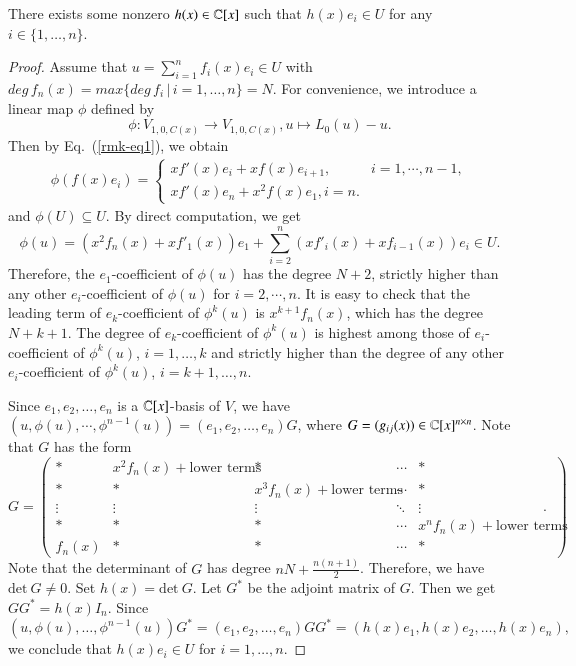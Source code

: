 \documentclass[12pt]{amsart}
\begin{document}
\begin{lem}\label{lem-l2}
There exists some nonzero $h(x)\in \mathbb{C}[x]$ such that $h(x)e_i\in U$ for any $i\in \{1, \ldots,n\}$.
\end{lem}
\begin{proof}
Assume that $u=\sum_{i=1}^n f_i(x)e_i\in U$ with $deg\,f_n(x)=max\{deg\,f_i\,|\, i=1,\ldots,n\}=N$. For convenience, we introduce a linear map $\phi$ defined by $$\phi:V_{1,0,C(x)}\rightarrow V_{1, 0, C(x)}, u\mapsto L_0(u)-u.$$ Then by Eq.~(\ref{rmk-eq1}), we obtain\begin{equation*}
\begin{aligned}
\phi(f(x) e_i)=
\begin{cases}
x f'(x)e_i + x f(x) e_{i+1}, &i=1,\cdots,n-1, \\
x f'(x)e_n + x^2 f(x) e_1,i=n.
\end{cases}
\end{aligned}
\end{equation*} and $\phi(U)\subseteq U$. By direct computation, we get
$$\phi(u)=(x^2f_n(x)+xf'_1(x))e_1+\sum_{i=2}^n (x f'_i(x)+xf_{i-1}(x)) e_i\in U.$$
Therefore, the $e_1$-coefficient of $\phi(u)$ has the
degree $N+2$, strictly higher than any other $e_i$-coefficient of $\phi(u)$ for $i=2,\cdots,n$.
It is easy to check that the leading term of $e_k$-coefficient of $\phi^k(u)$ is $x^{k+1}f_n(x)$, which has
the degree $N+k+1$.
The degree of $e_k$-coefficient of $\phi^k(u)$ is highest among those of $e_i$-coefficient of $\phi^k(u)$, $i=1,\ldots,k$ and
strictly higher than the degree of any other $e_i$-coefficient of $\phi^k(u)$, $i=k+1,\ldots,n$. %

Since $e_1,e_2,\ldots,e_n$ is a $\mathbb{C}[x]$-basis of $V$, we have
$(u,\phi(u),\cdots,\phi^{n-1}(u))=(e_1,e_2,\ldots,e_n)G$, where $G=(g_{ij}(x))\in\mathbb{C}[x]^{n\times n}$.
Note that
$G$ has the form
\begin{equation}
G=
\begin{pmatrix}
\ast &x^2f_n(x)+\text{lower terms}&\ast&\cdots&\ast\\
\ast &\ast&x^3f_n(x)+\text{lower terms}&\cdots&\ast\\
\vdots&\vdots&\vdots&\ddots&\vdots\\
\ast&\ast&\ast&\cdots&x^nf_n(x)+\text{lower terms}\\
f_n(x)&\ast&\ast&\cdots&\ast
\end{pmatrix}.
\end{equation}
Note that the determinant of $G$ has degree $nN+\frac{n(n+1)}{2}$. Therefore, we have $\text{det}~G\neq 0$. Set $h(x)=\text{det}~G$.
Let $G^*$ be the adjoint matrix of $G$. Then we get $GG^*=h(x)I_n$. Since
$$(u,\phi(u),\ldots,\phi^{n-1}(u))G^*=(e_1,e_2,\ldots,e_n)GG^*=(h(x)e_1,h(x)e_2,\ldots,h(x)e_n),$$
we conclude that $h(x)e_i\in U$ for $i=1,\ldots,n$.
\end{proof}
\end{document}
